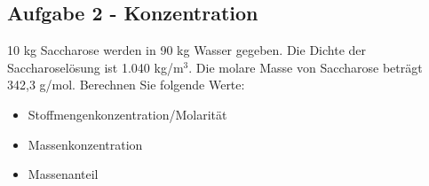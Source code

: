 \documentclass[a4paper,11pt]{article}
\newif\ifshowme
\begin{document}
\subsection*{Aufgabe 2 - Konzentration}
10 kg Saccharose werden in 90 kg Wasser gegeben. Die Dichte der Saccharoselösung ist 1.040 kg/m$^3$. Die molare Masse von Saccharose beträgt 342,3 g/mol. Berechnen Sie folgende Werte: 

\begin{itemize}
\item Stoffmengenkonzentration/Molarität

\ifshowme
\antwort{
\begin{align*}
c = \frac{n}{V} = \frac{m / M}{m / \rho} &= \frac{10~\text{kg} ~/~ 0,3423~\text{kg$\cdot$mol}^{-1}}{100 ~\text{kg} ~/~ 1.040~\text{kg$\cdot$m}^{-3}}\\ &= 303,83~\text{mol/m}^3 \\
&= 0,3~\text{mol/L}
\end{align*}
}
\else
\fi
\item Massenkonzentration
\ifshowme
\antwort{
\begin{align*}
\beta = \frac{m}{V} = \frac{m}{m / \rho} = \frac{10~\text{kg}}{100 ~\text{kg} / 1.040~\text{kg/m}^3} = 104 ~\text{kg/m}^3
\end{align*}
}
\else
\fi
\item Massenanteil
\ifshowme
\antwort{
\begin{align*}
w = \frac{m}{m} = \frac{10~\text{kg}}{100~\text{kg}} = 0,1 = 10\%
\end{align*}
}
\else
\fi

\end{itemize}


\pagebreak
\end{document}
